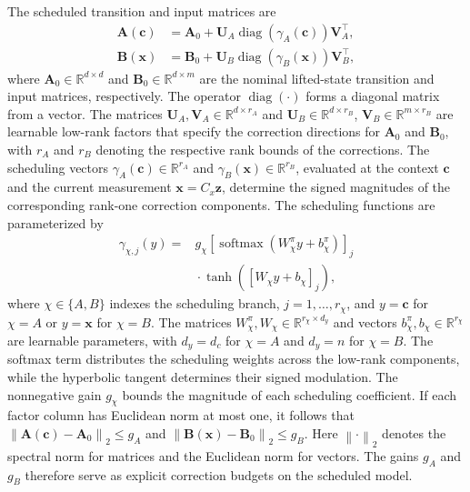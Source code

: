 \documentclass[journal]{IEEEtran}
\theoremstyle{plain}
\theoremstyle{definition}
\newcommand{\vx}{\mathbf{x}}
\newcommand{\vz}{\mathbf{z}}
\newcommand{\vc}{\mathbf{c}}
\newcommand{\mA}{\mathbf{A}}
\newcommand{\mB}{\mathbf{B}}
\newcommand{\mU}{\mathbf{U}}
\newcommand{\mV}{\mathbf{V}}
\newcommand{\R}{\mathbb{R}}
\newcommand{\norm}[1]{\left\lVert #1\right\rVert}
\begin{document}
The scheduled transition and input matrices are
\begin{align}
\mA(\vc)&=\mA_0+\mU_A\operatorname{diag}(\gamma_A(\vc))\mV_A^\top,
\label{eq:scheduled_A}\\
\mB(\vx)&=\mB_0+\mU_B\operatorname{diag}(\gamma_B(\vx))\mV_B^\top,
\label{eq:scheduled_B}
\end{align}
where $\mA_0\in\R^{d\times d}$ and $\mB_0\in\R^{d\times m}$ are the nominal lifted-state transition and input matrices, respectively. The operator $\operatorname{diag}(\cdot)$ forms a diagonal matrix from a vector. The matrices $\mU_A,\mV_A\in\R^{d\times r_A}$ and $\mU_B\in\R^{d\times r_B}$, $\mV_B\in\R^{m\times r_B}$ are learnable low-rank factors that specify the correction directions for $\mA_0$ and $\mB_0$, with $r_A$ and $r_B$ denoting the respective rank bounds of the corrections. The scheduling vectors $\gamma_A(\vc)\in\R^{r_A}$ and $\gamma_B(\vx)\in\R^{r_B}$, evaluated at the context $\vc$ and the current measurement $\vx=C_x\vz$, determine the signed magnitudes of the corresponding rank-one correction components. The scheduling functions are parameterized by
\begin{equation}
\begin{aligned}
\gamma_{\chi,j}(y)={}&g_\chi\left[\operatorname{softmax}(W_\chi^\pi y+b_\chi^\pi)\right]_j\\
&{}\cdot\tanh\left([W_\chi y+b_\chi]_j\right),
\end{aligned}
\label{eq:scheduling_function}
\end{equation}
where $\chi\in\{A,B\}$ indexes the scheduling branch, $j=1,\ldots,r_\chi$, and $y=\vc$ for $\chi=A$ or $y=\vx$ for $\chi=B$. The matrices $W_\chi^\pi,W_\chi\in\R^{r_\chi\times d_y}$ and vectors $b_\chi^\pi,b_\chi\in\R^{r_\chi}$ are learnable parameters, with $d_y=d_c$ for $\chi=A$ and $d_y=n$ for $\chi=B$. The softmax term distributes the scheduling weights across the low-rank components, while the hyperbolic tangent determines their signed modulation. The nonnegative gain $g_\chi$ bounds the magnitude of each scheduling coefficient. If each factor column has Euclidean norm at most one, it follows that $\norm{\mA(\vc)-\mA_0}_2\leq g_A$ and $\norm{\mB(\vx)-\mB_0}_2\leq g_B$. Here $\norm{\cdot}_2$ denotes the spectral norm for matrices and the Euclidean norm for vectors. The gains $g_A$ and $g_B$ therefore serve as explicit correction budgets on the scheduled model.
\end{document}
